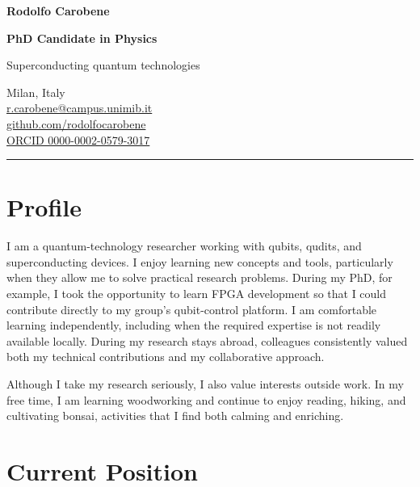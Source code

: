 \documentclass[10pt,a4paper]{article}
\newcommand{\cvsection}[1]{%
  \Needspace{7\baselineskip}%
  \section{#1}%
}
\newcommand{\profilebox}[1]{%
  \par\begingroup
  \setlength{\fboxsep}{0.85em}%
  \noindent\colorbox{AccentPale}{%
    \parbox{\dimexpr\linewidth-2\fboxsep\relax}{%
      \small\color{DarkGrey}#1%
    }%
  }%
  \endgroup\par
}
\begin{document}
\begin{minipage}[t]{0.58\textwidth}
  \vspace{0pt}
  {\fontsize{27}{30}\selectfont\bfseries\color{DarkGrey}Rodolfo Carobene}\par
  \vspace{0.3em}
  {\large\bfseries\color{Accent}PhD Candidate in Physics}\par
  {\normalsize\color{AccentMuted}Superconducting quantum technologies}
\end{minipage}%
\hfill
\begin{minipage}[t]{0.39\textwidth}
  \vspace{0.15em}
  \raggedleft\small
  Milan, Italy\\[0.15em]
  \href{mailto:r.carobene@campus.unimib.it}{r.carobene@campus.unimib.it}\\[0.15em]
  \href{https://github.com/rodolfocarobene}{github.com/rodolfocarobene}\\[0.15em]
  \href{https://orcid.org/0000-0002-0579-3017}{ORCID 0000-0002-0579-3017}
\end{minipage}

\vspace{0.7em}
{\color{Accent}\rule{\textwidth}{1.2pt}}
\vspace{0.15em}

\cvsection{Profile}

\profilebox{%
I am a quantum-technology researcher working with qubits, qudits, and superconducting devices. I enjoy learning new concepts and tools, particularly when they allow me to solve practical research problems. During my PhD, for example, I took the opportunity to learn FPGA development so that I could contribute directly to my group's qubit-control platform.
I am comfortable learning independently, including when the required expertise is not readily available locally. During my research stays abroad, colleagues consistently valued both my technical contributions and my collaborative approach.

Although I take my research seriously, I also value interests outside work. In my free time, I am learning woodworking and continue to enjoy reading, hiking, and cultivating bonsai, activities that I find both calming and enriching.
}

\cvsection{Current Position}
\end{document}
